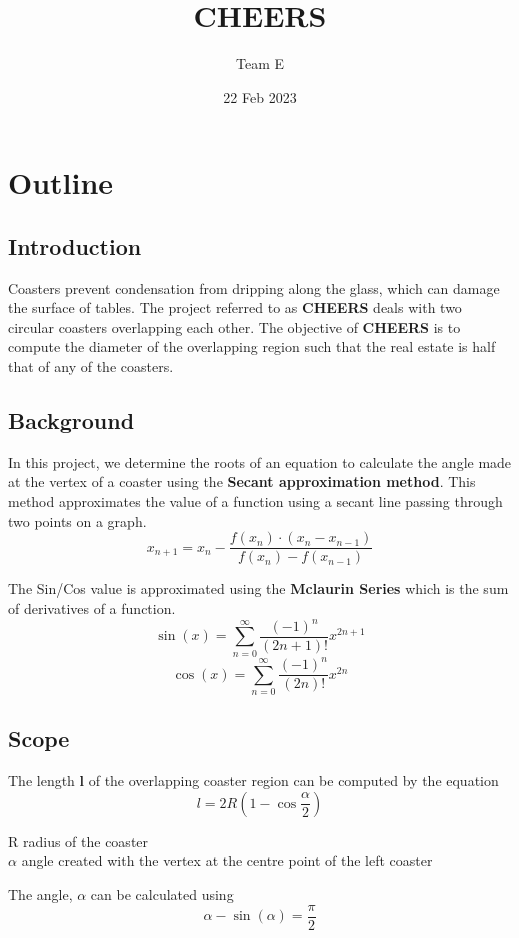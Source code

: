 \documentclass{report}
\begin{document}
\title{CHEERS}
\author{Team E}
\date{22 Feb 2023}
\maketitle
\tableofcontents{}
\printindex{}

\chapter{Outline}
\section{Introduction}
  Coasters prevent condensation from dripping along the glass, which can damage the surface of tables. The project referred to as \textbf {CHEERS} deals with two circular coasters overlapping each other. The objective of \textbf {CHEERS} is to compute the diameter of the overlapping region such that 
  the real estate is half that of any of the coasters.

\section{Background}
  In this project, we determine the roots of an equation to calculate the angle made at the vertex of a coaster using the \textbf{Secant approximation method}. This method approximates the value of a function using a secant line passing through two points on a graph.
  $$ x_{n+1} = x_n - \frac{f(x_n) \cdot (x_n - x_{n-1})}{f(x_n) - f(x_{n-1})} $$

  \vspace*{20pt}
  \noindent The Sin/Cos value is approximated using the \textbf{Mclaurin Series} which is the sum of derivatives of a function.
  $$\sin(x) = \sum_{n=0}^{\infty} \frac{(-1)^n}{(2n+1)!}x^{2n+1}$$
  $$\cos(x) = \sum_{n=0}^{\infty} \frac{(-1)^n}{(2n)!}x^{2n}$$ 

\section{Scope}
  The length \textbf{l} of the overlapping coaster region can be computed by the equation
  $$l = 2R\left(1 - \cos\frac{\alpha}{2}\right)$$

  \indent R \textrightarrow \;radius of the coaster \\
  \indent $\alpha$ \textrightarrow \;angle created with the vertex at the centre point of the left coaster

  \vspace{20pt}
  The angle, $\alpha$ can be calculated using
  $$\alpha - \sin(\alpha) = \frac{\pi}{2}$$
  
\end{document}
